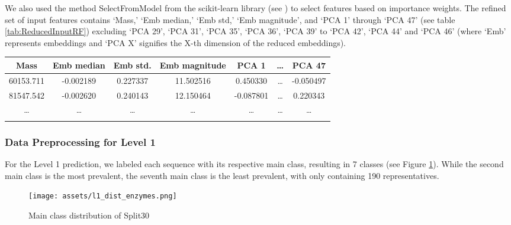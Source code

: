 \documentclass{bioinfo}
\begin{document}
\begin{methods}
We also used the method SelectFromModel from the scikit-learn library (see \cite{scikit-learn})
to select features based on importance weights. 
The refined set of input features contains 
‘Mass,’ ‘Emb median,’ ‘Emb std,’ ‘Emb magnitude’, and ‘PCA 1’ through ‘PCA 47’ (see table \ref{tab:ReducedInputRF}) excluding ‘PCA 29’, ‘PCA 31’, ‘PCA 35’,
‘PCA 36’, ‘PCA 39’ to ‘PCA 42’, ‘PCA 44’ and ‘PCA 46’ (where ‘Emb’ represents embeddings and ‘PCA X’ signifies the X-th dimension of the reduced embeddings).

\begin{table}[!htbp]
\setlength{\tabcolsep}{2pt}
 {
	\begin{tabular}{@{}ccccccc@{}}
		\toprule 
		Mass & Emb median & Emb std. & Emb magnitude & PCA 1 & \dots & PCA 47\\
		\midrule
		60153.711 & -0.002189 & 0.227337 & 11.502516 & 0.450330 & \dots & -0.050497\\
		81547.542 & -0.002620 & 0.240143 & 12.150464 & -0.087801 & \dots & 0.220343 \\
		\dots & \dots & \dots & \dots & \dots & \dots & \dots \\
		\botrule
    \end{tabular}
}{}
\end{table}

\subsubsection{Data Preprocessing for Level 1}
For the Level 1 prediction, we labeled each sequence with its respective main class,
resulting in 7 classes (see Figure \ref{fig:l1_dist_train}).
While the second main class is the most prevalent, 
the seventh main class is the least prevalent, with only
containing 190 representatives.

\begin{figure}[!hb]
\texttt{[image: assets/l1\_dist\_enzymes.png]}
\caption{Main class distribution of Split30}\label{fig:l1_dist_train}
\end{figure}



\end{methods}
\end{document}
